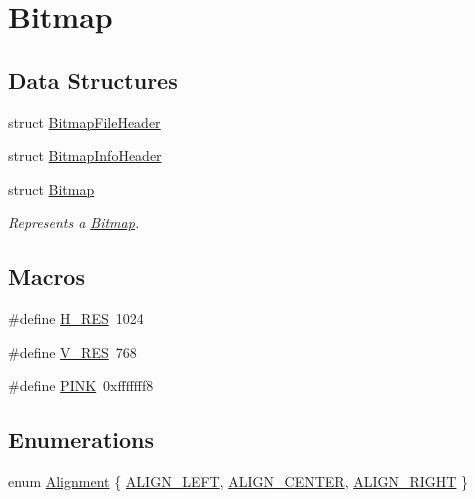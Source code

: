 \hypertarget{group___bitmap}{}\section{Bitmap}
\label{group___bitmap}
\subsection*{Data Structures}
\begin{DoxyCompactItemize}
\item 
struct \hyperlink{struct_bitmap_file_header}{Bitmap\+File\+Header}
\item 
struct \hyperlink{struct_bitmap_info_header}{Bitmap\+Info\+Header}
\item 
struct \hyperlink{struct_bitmap}{Bitmap}
\begin{DoxyCompactList}\small\item\em Represents a \hyperlink{struct_bitmap}{Bitmap}. \end{DoxyCompactList}\end{DoxyCompactItemize}
\subsection*{Macros}
\begin{DoxyCompactItemize}
\item 
\#define \hyperlink{group___bitmap_gabf6f66114c31b8f87c80534ca695a00b}{H\+\_\+\+R\+ES}~1024
\item 
\#define \hyperlink{group___bitmap_gaac2466862bcfc18231c38fe1eacc22e3}{V\+\_\+\+R\+ES}~768
\item 
\#define \hyperlink{group___bitmap_gada419fe3b48fcf19daed7cc57ccf1174}{P\+I\+NK}~0xfffffff8
\end{DoxyCompactItemize}
\subsection*{Enumerations}
\begin{DoxyCompactItemize}
\item 
enum \hyperlink{group___bitmap_gacdfaca60ec19c0265bac2692d7982726}{Alignment} \{ \hyperlink{group___bitmap_ggacdfaca60ec19c0265bac2692d7982726a6ec599857e15466988726932dd592305}{A\+L\+I\+G\+N\+\_\+\+L\+E\+FT}, 
\hyperlink{group___bitmap_ggacdfaca60ec19c0265bac2692d7982726a5624165187e56db612253e608a45b1c6}{A\+L\+I\+G\+N\+\_\+\+C\+E\+N\+T\+ER}, 
\hyperlink{group___bitmap_ggacdfaca60ec19c0265bac2692d7982726a9c81840e8cad46418b39a8b74a246354}{A\+L\+I\+G\+N\+\_\+\+R\+I\+G\+HT}
 \}
\end{DoxyCompactItemize}
